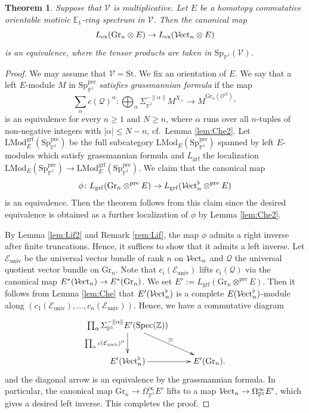 \documentclass{amsart}
\theoremstyle{plain}
\newtheorem{theorem}{Theorem}[subsection]
\theoremstyle{definition}
\theoremstyle{remark}
\numberwithin{equation}{theorem}
\newcommand{\mcal}[1]{\mathcal{#1}}
\newcommand{\mbb}[1]{\mathbb{#1}}
\newcommand{\Gr}{\mathrm{Gr}}
\newcommand{\LMod}{\mathrm{LMod}}
\newcommand{\Spec}{\mathrm{Spec}}
\newcommand{\St}{\mathrm{St}}
\newcommand{\V}{\mathcal{V}}
\newcommand{\ex}{\mathrm{ex}}
\newcommand{\grf}{\mathrm{grf}}
\newcommand{\pre}{\mathrm{pre}}
\newcommand{\univ}{\mathrm{univ}}
\newcommand{\OmegaP}{\Omega_{\mathbb{P}^1}}
\newcommand{\SigmaP}{\Sigma_{\mathbb{P}^1}}
\newcommand{\SpP}{\mathrm{Sp}_{\mathbb{P}^1}}
\newcommand{\Vect}{{\mathcal{V}\mspace{-2.0mu}\mathrm{ect}}}
\begin{document}
\begin{theorem}\label{thm:Che}
Suppose that $\V$ is multiplicative.
Let $E$ be a homotopy commutative orientable motivic $\mbb{E}_1$-ring spectrum in $\V$.
Then the canonical map
\[
	L_\ex(\Gr_n\otimes E) \to L_\ex(\Vect_n\otimes E)
\]
is an equivalence, where the tensor products are taken in $\SpP(\V)$.
\end{theorem}
\begin{proof}
We may assume that $\V=\St$.
We fix an orientation of $E$.
We say that a left $E$-module $M$ in $\SpP^\pre$ \textit{satisfies grassmannian formula} if the map
\[
	\sum_\alpha c(\mcal{Q})^\alpha \colon \bigoplus_\alpha \SigmaP^{-\lVert\alpha\rVert}M^{X_+} \to M^{\Gr_n(\mcal{O}^N)_+}
\]
is an equivalence for every $n\ge 1$ and $N\ge n$, where $\alpha$ runs over all $n$-tuples of non-negative integers with $|\alpha|\le N-n$, cf.\ Lemma \ref{lem:Che2}.
Let $\LMod_E^\grf(\SpP^\pre)$ be the full subcategory $\LMod_E(\SpP^\pre)$ spanned by left $E$-modules which satisfy grassmannian formula and $L_\grf$ the localization $\LMod_E(\SpP^\pre)\to\LMod_E^\grf(\SpP^\pre)$.
We claim that the canonical map
\[
	\phi \colon L_\grf(\Gr_n\otimes^\pre E) \to L_\grf(\Vect_n^\flat\otimes^\pre E)
\]
is an equivalence.
Then the theorem follows from this claim since the desired equivalence is obtained as a further localization of $\phi$ by Lemma \ref{lem:Che2}.

By Lemma \ref{lem:Lif2} and Remark \ref{rem:Lif}, the map $\phi$ admits a right inverse after finite truncations.
Hence, it suffices to show that it admits a left inverse.
Let $\mcal{E}_\univ$ be the universal vector bundle of rank $n$ on $\Vect_n$ and $\mcal{Q}$ the universal quotient vector bundle on $\Gr_n$.
Note that $c_i(\mcal{E}_\univ)$ lifts $c_i(\mcal{Q})$ via the canonical map $E^*(\Vect_n)\to E^*(\Gr_n)$.
We set $E':=L_\grf(\Gr_n\otimes^\pre E)$.
Then it follows from Lemma \ref{lem:Che} that  $E'(\Vect_n^\flat)$ is a complete $E(\Vect_n^\flat)$-module along $(c_1(\mcal{E}_\univ),\dotsc,c_n(\mcal{E}_\univ))$.
Hence, we have a commutative diagram
\[
\xymatrix{
	\prod_\alpha \SigmaP^{-\lVert\alpha\rVert}E'(\Spec(\mbb{Z})) \ar[rd]^\simeq \ar[d]_{\prod_\alpha c(\mcal{E}_\univ)^\alpha} & \\
	E'(\Vect_n^\flat) \ar[r] & E'(\Gr_n).
}
\]
and the diagonal arrow is an equivalence by the grassmannian formula.
In particular, the canonical map $\Gr_n\to\OmegaP^\infty E'$ lifts to a map $\Vect_n\to\OmegaP^\infty E'$, which gives a desired left inverse.
This completes the proof.
\end{proof}
\end{document}
